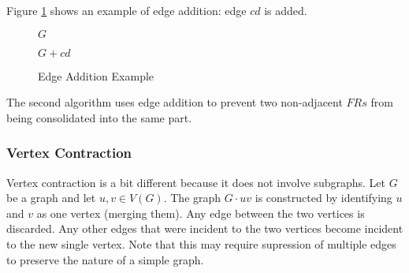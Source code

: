 Figure \ref{fig:eadd} shows an example of edge addition: edge \(cd\) is added.

\begin{figure}[h]
  \label{fig:eadd}
  \begin{minipage}{3in}
    \begin{center}

      \bigskip

      \(G\)
    \end{center}
  \end{minipage}
  \begin{minipage}{3in}
    \begin{center}

      \bigskip

      \(G+cd\)
    \end{center}
  \end{minipage}
  \caption{Edge Addition Example}
\end{figure}

The second algorithm uses edge addition to prevent two non-adjacent \(FRs\) from being consolidated into the same
part.

\subsubsection{Vertex Contraction}

Vertex contraction is a bit different because it does not involve subgraphs.  Let \(G\) be a graph and let \(u,v\in
V(G)\).  The graph \(G\cdot uv\) is constructed by identifying \(u\) and \(v\) as one vertex (merging them).  Any
edge between the two vertices is discarded.  Any other edges that were incident to the two vertices become incident
to the new single vertex.  Note that this may require supression of multiple edges to preserve the nature of a
simple graph.

